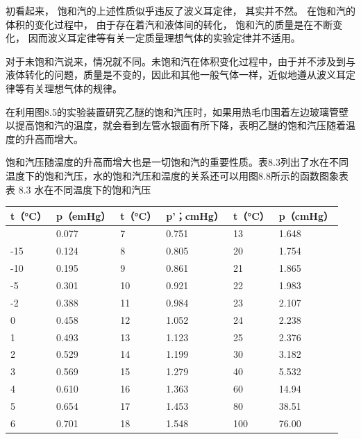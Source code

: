 初看起来， 饱和汽的上述性质似乎违反了波义耳定律， 其实并不然。
在饱和汽的体积的变化过程中， 由于存在着汽和液体间的转化，
饱和汽的质量是在不断变化，
因而波义耳定律等有关一定质量理想气体的实验定律并不适用。

对于未饱和汽说来，情况就不同。未饱和汽在体积变化过程中，由于并不涉及到与液体转化的问题，质量是不变的，因此和其他一般气体一样，近似地遵从波义耳定律等有关理想气体的规律。

在利用图8.5的实验装置研究乙醚的饱和汽压时，如果用热毛巾围着左边玻璃管壁以提高饱和汽的温度，就会看到左管水银面有所下降，表明乙醚的饱和汽压随着温度的升高而增大。

饱和汽压随温度的升高而增大也是一切饱和汽的重要性质。表8.3列出了水在不同温度下的饱和汽压，水的饱和汽压和温度的关系还可以用图8.8所示的函数图象表表
8.3 水在不同温度下的饱和汽压

{\def\LTcaptype{none} %
\begin{longtable}[]{@{}llllll@{}}
\toprule\noalign{}
t（°C） & p（emHg） & t（°C） & p'；cmHg） & t（°C） & p（cmHg） \\
\midrule\noalign{}
\endhead
\bottomrule\noalign{}
\endlastfoot
-20 & 0.077 & 7 & 0.751 & 13 & 1.648 \\
-15 & 0.124 & 8 & 0.805 & 20 & 1.754 \\
-10 & 0.195 & 9 & 0.861 & 21 & 1.865 \\
-5 & 0.301 & 10 & 0.921 & 22 & 1.983 \\
-2 & 0.388 & 11 & 0.984 & 23 & 2.107 \\
0 & 0.458 & 12 & 1.052 & 24 & 2.238 \\
1 & 0.493 & 13 & 1.123 & 25 & 2.376 \\
2 & 0.529 & 14 & 1.199 & 30 & 3.182 \\
3 & 0.569 & 15 & 1.279 & 40 & 5.532 \\
4 & 0.610 & 16 & 1.363 & 60 & 14.94 \\
5 & 0.654 & 17 & 1.453 & 80 & 38.51 \\
6 & 0.701 & 18 & 1.548 & 100 & 76.00 \\
\end{longtable}
}

